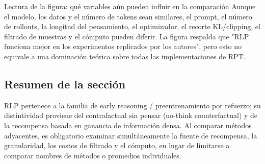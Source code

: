 
\begin{knowledgebox}{Lectura de la figura: qué variables aún pueden influir en la comparación}
Aunque el modelo, los datos y el número de tokens sean similares, el prompt, el número de rollouts, la longitud del pensamiento, el optimizador, el recorte KL/clipping, el filtrado de muestras y el cómputo pueden diferir. La figura respalda que "RLP funciona mejor en los experimentos replicados por los autores", pero esto no equivale a una dominación teórica sobre todas las implementaciones de RPT.
\end{knowledgebox}

\subsection{Resumen de la sección}

RLP pertenece a la familia de early reasoning / preentrenamiento por refuerzo; su distintividad proviene del contrafactual sin pensar (no-think counterfactual) y de la recompensa basada en ganancia de información densa. Al comparar métodos adyacentes, es obligatorio examinar simultáneamente la fuente de recompensa, la granularidad, los costos de filtrado y el cómputo, en lugar de limitarse a comparar nombres de métodos o promedios individuales.

